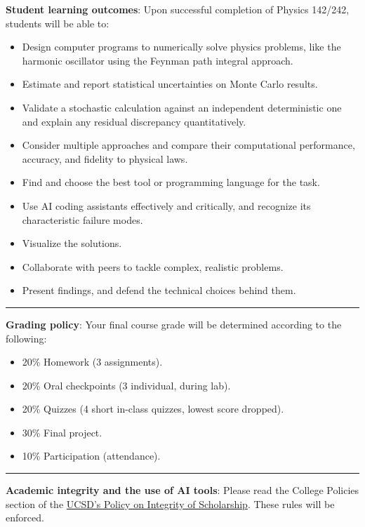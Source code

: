 \documentclass[12pt]{article}
\begin{document}
\noindent\textbf{Student learning outcomes}: Upon successful completion of Physics 142/242, students will be able to:
\begin{itemize}
  \itemsep-0.3em
  \item Design computer programs to numerically solve physics problems, like the harmonic oscillator using the Feynman path integral approach.
  \item Estimate and report statistical uncertainties on Monte Carlo results.
  \item Validate a stochastic calculation against an independent deterministic one and explain any residual discrepancy quantitatively.
  \item Consider multiple approaches and compare their computational performance, accuracy, and fidelity to physical laws.
  \item Find and choose the best tool or programming language for the task.
  \item Use AI coding assistants effectively and critically, and recognize its characteristic failure modes.
  \item Visualize the solutions.
  \item Collaborate with peers to tackle complex, realistic problems.
  \item Present findings, and defend the technical choices behind them.
\end{itemize}

\begin{center}
  \rule{\textwidth}{0.5pt}
\end{center}

\noindent\textbf{Grading policy}: Your final course grade will be determined according to the following:
\begin{itemize}
  \itemsep-0.3em
  \item 20\% Homework (3 assignments).
  \item 20\% Oral checkpoints (3 individual, during lab).
  \item 20\% Quizzes (4 short in-class quizzes, lowest score dropped).
  \item 30\% Final project.
  \item 10\% Participation (attendance).
\end{itemize}

\begin{center}
  \rule{\textwidth}{0.5pt}
\end{center}

\noindent\textbf{Academic integrity and the use of AI tools}: Please read the College Policies section of the \href{http://senate.ucsd.edu/Operating-Procedures/Senate-Manual/Appendices/2}{UCSD's Policy on Integrity of Scholarship}. These rules will be enforced.
\end{document}
